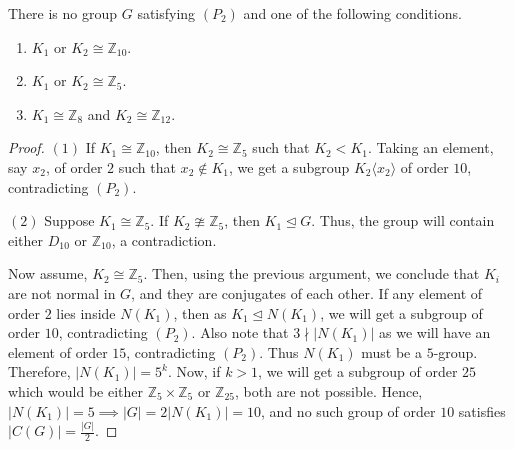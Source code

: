 \documentclass[10pt,a4paper]{amsart}
\begin{document}
\begin{lemma}\label{lemma5}
   There is no group $G$ satisfying $(P_2)$ and one of the following conditions.
   \begin{enumerate}
\item $K_1$ or $K_2 \cong \mathbb Z_{10}$.

\item $K_1$ or $K_2 \cong \mathbb Z_{5}$.



        \item $K_1 \cong \mathbb{Z}_{8}$ and $K_2 \cong \mathbb{Z}_{12}$.


   \end{enumerate}
\end{lemma}

\begin{proof} 
$(1)$ If $K_1\cong \mathbb{Z}_{10}$, then $K_2\cong \mathbb{Z}_5$ such that $K_2 < K_1$. Taking an element, say $x_2$, of order $2$ such that $x_2\notin K_1$, we get a subgroup $K_2\langle x_2\rangle $ of order $10$, contradicting $(P_2)$.

    
    $(2)$ Suppose $K_1\cong \mathbb{Z}_5$. If $K_2\ncong \mathbb{Z}_5$, then $K_1\trianglelefteq G$. Thus, the group will contain either $D_{10}$ or $\mathbb{Z}_{10}$, a contradiction.
    

    Now assume, $K_2\cong \mathbb{Z}_5$. Then, using the previous argument, we conclude that $K_i$ are not normal in $G$, and they are conjugates of each other. 
    If any element of order $2$ lies inside $N(K_1)$, then as $K_1\trianglelefteq N(K_1)$, we will get a subgroup of order $10$,  contradicting $(P_2)$. Also note that $3 \nmid |N(K_1)|$ as we will have an element of order $15$, contradicting $(P_{2})$. Thus $N(K_1)$ must be a $5$-group. Therefore, $|N(K_1)| = 5^k$. 
    Now, if $k>1$, we will get a subgroup of order $25$ which would be either $\mathbb{Z}_5\times \mathbb{Z}_5$ or $\mathbb{Z}_{25}$, both are not possible. Hence, $|N(K_1)| = 5 \implies |G| = 2|N(K_1)| = 10$, and no such group of order $10$ satisfies $|C(G)| = \frac{|G|}{2}$.


\end{proof}
\end{document}
